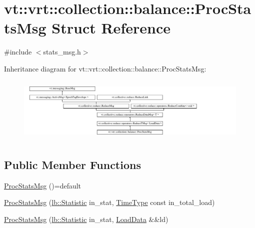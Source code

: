 \hypertarget{structvt_1_1vrt_1_1collection_1_1balance_1_1_proc_stats_msg}{}\section{vt\+:\+:vrt\+:\+:collection\+:\+:balance\+:\+:Proc\+Stats\+Msg Struct Reference}
\label{structvt_1_1vrt_1_1collection_1_1balance_1_1_proc_stats_msg}


{\ttfamily \#include $<$stats\+\_\+msg.\+h$>$}

Inheritance diagram for vt\+:\+:vrt\+:\+:collection\+:\+:balance\+:\+:Proc\+Stats\+Msg\+:\begin{figure}[H]
\begin{center}
\leavevmode
\includegraphics[height=3.163842cm]{structvt_1_1vrt_1_1collection_1_1balance_1_1_proc_stats_msg}
\end{center}
\end{figure}
\subsection*{Public Member Functions}
\begin{DoxyCompactItemize}
\item 
\hyperlink{structvt_1_1vrt_1_1collection_1_1balance_1_1_proc_stats_msg_a2466595ab497ed3f3e3fccb7ad6e3aa6}{Proc\+Stats\+Msg} ()=default
\item 
\hyperlink{structvt_1_1vrt_1_1collection_1_1balance_1_1_proc_stats_msg_ac4b5ac7c62b0485b23113a2eb3cef658}{Proc\+Stats\+Msg} (\hyperlink{namespacevt_1_1vrt_1_1collection_1_1lb_af0e20ef9afee77295053aa83bf1348b1}{lb\+::\+Statistic} in\+\_\+stat, \hyperlink{namespacevt_a876a9d0cd5a952859c72de8a46881442}{Time\+Type} const in\+\_\+total\+\_\+load)
\item 
\hyperlink{structvt_1_1vrt_1_1collection_1_1balance_1_1_proc_stats_msg_a11420fc6d4faf385291097c70aaac452}{Proc\+Stats\+Msg} (\hyperlink{namespacevt_1_1vrt_1_1collection_1_1lb_af0e20ef9afee77295053aa83bf1348b1}{lb\+::\+Statistic} in\+\_\+stat, \hyperlink{structvt_1_1vrt_1_1collection_1_1balance_1_1_load_data}{Load\+Data} \&\&ld)
\end{DoxyCompactItemize}
